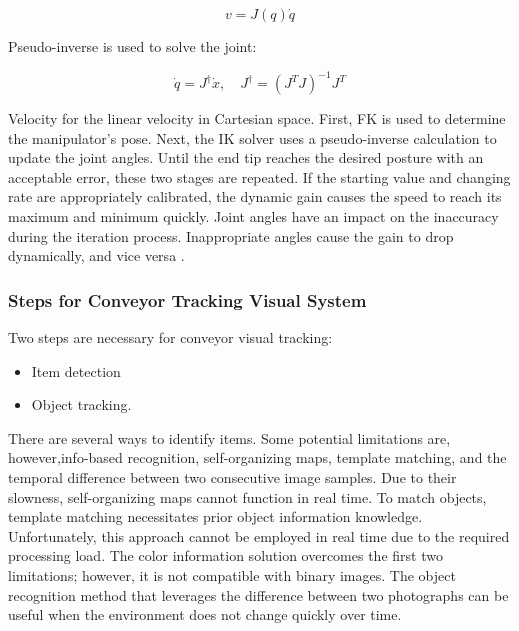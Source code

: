 \documentclass[12pt]{article}
\begin{document}
\[
v = J(q) \dot{q} 
\]

Pseudo-inverse is used to solve the joint:\cite{ref19}


\[
\dot{q} = J^\dagger \dot{x}, \quad J^\dagger = (J^T J)^{-1} J^T
\]

Velocity for the linear velocity in Cartesian space. First, FK is used to determine the manipulator's pose. Next, the IK solver uses a pseudo-inverse calculation to update the joint angles. Until the end tip reaches the desired posture with an acceptable error, these two stages are repeated. If the starting value and changing rate are appropriately calibrated, the dynamic gain causes the speed to reach its maximum and minimum quickly. Joint angles have an impact on the inaccuracy during the iteration process. Inappropriate angles cause the gain to drop dynamically, and vice versa \cite{ref19}.

\subsubsection{Steps for Conveyor Tracking Visual System}

Two steps are necessary for conveyor visual tracking: \cite{ref12}
\begin{itemize}
\item Item detection
\item Object tracking.
\end{itemize}
There are several ways to identify items. Some potential limitations are, however,info-based recognition, self-organizing maps, template matching, and the temporal difference between two consecutive image samples. Due to their slowness, self-organizing maps cannot function in real time. To match objects, template matching necessitates prior object information knowledge.  Unfortunately, this approach cannot be employed in real time due to the required processing load. The color information solution overcomes the first two limitations; however, it is not compatible with binary images. The object recognition method that leverages the difference between two photographs can be useful when the environment does not change quickly over time\cite{ref12}.
\end{document}
